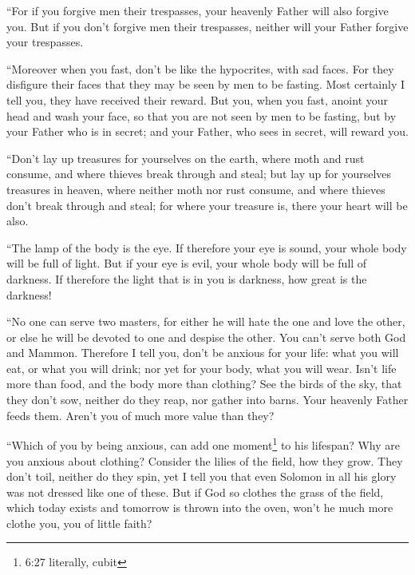  ``For if you forgive men their trespasses, your heavenly
Father will also forgive you.  But if you don't forgive men
their trespasses, neither will your Father forgive your trespasses.

 ``Moreover when you fast, don't be like the hypocrites,
with sad faces. For they disfigure their faces that they may be seen by
men to be fasting. Most certainly I tell you, they have received their
reward.  But you, when you fast, anoint your head and wash
your face,  so that you are not seen by men to be fasting,
but by your Father who is in secret; and your Father, who sees in
secret, will reward you.

 ``Don't lay up treasures for yourselves on the earth,
where moth and rust consume, and where thieves break through and steal;
 but lay up for yourselves treasures in heaven, where
neither moth nor rust consume, and where thieves don't break through and
steal;  for where your treasure is, there your heart will
be also.

 ``The lamp of the body is the eye. If therefore your eye
is sound, your whole body will be full of light.  But if
your eye is evil, your whole body will be full of darkness. If therefore
the light that is in you is darkness, how great is the darkness!

 ``No one can serve two masters, for either he will hate
the one and love the other, or else he will be devoted to one and
despise the other. You can't serve both God and Mammon. 
Therefore I tell you, don't be anxious for your life: what you will eat,
or what you will drink; nor yet for your body, what you will wear. Isn't
life more than food, and the body more than clothing?  See
the birds of the sky, that they don't sow, neither do they reap, nor
gather into barns. Your heavenly Father feeds them. Aren't you of much
more value than they?

 ``Which of you by being anxious, can add one
moment\footnote{6:27 literally, cubit} to his lifespan? 
Why are you anxious about clothing? Consider the lilies of the field,
how they grow. They don't toil, neither do they spin,  yet
I tell you that even Solomon in all his glory was not dressed like one
of these.  But if God so clothes the grass of the field,
which today exists and tomorrow is thrown into the oven, won't he much
more clothe you, you of little faith?

